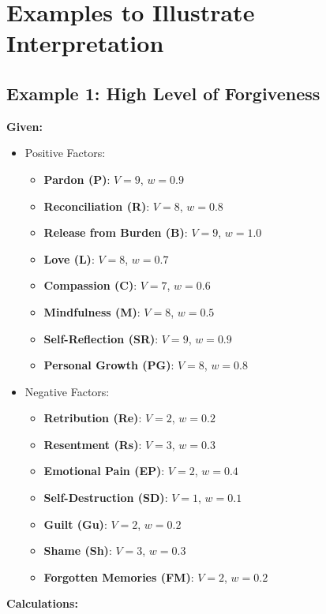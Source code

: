 \documentclass{article}
\begin{document}
\section*{Examples to Illustrate Interpretation}

\subsection*{Example 1: High Level of Forgiveness}

\textbf{Given:}

\begin{itemize}
    \item Positive Factors:
    \begin{itemize}
        \item \textbf{Pardon (P)}: $V = 9$, $w = 0.9$
        \item \textbf{Reconciliation (R)}: $V = 8$, $w = 0.8$
        \item \textbf{Release from Burden (B)}: $V = 9$, $w = 1.0$
        \item \textbf{Love (L)}: $V = 8$, $w = 0.7$
        \item \textbf{Compassion (C)}: $V = 7$, $w = 0.6$
        \item \textbf{Mindfulness (M)}: $V = 8$, $w = 0.5$
        \item \textbf{Self-Reflection (SR)}: $V = 9$, $w = 0.9$
        \item \textbf{Personal Growth (PG)}: $V = 8$, $w = 0.8$
    \end{itemize}
    \item Negative Factors:
    \begin{itemize}
        \item \textbf{Retribution (Re)}: $V = 2$, $w = 0.2$
        \item \textbf{Resentment (Rs)}: $V = 3$, $w = 0.3$
        \item \textbf{Emotional Pain (EP)}: $V = 2$, $w = 0.4$
        \item \textbf{Self-Destruction (SD)}: $V = 1$, $w = 0.1$
        \item \textbf{Guilt (Gu)}: $V = 2$, $w = 0.2$
        \item \textbf{Shame (Sh)}: $V = 3$, $w = 0.3$
        \item \textbf{Forgotten Memories (FM)}: $V = 2$, $w = 0.2$
    \end{itemize}
\end{itemize}

\textbf{Calculations:}
\end{document}
